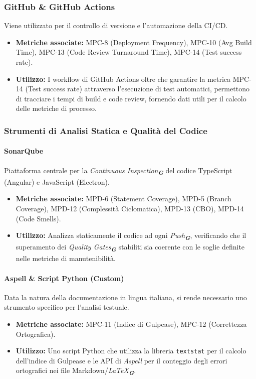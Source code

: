 \documentclass[a4paper,12pt]{article}
\newcommand{\glossario}[1]{\textit{#1}\textsubscript{\textbf{\textit{\textcolor{lightblack}{G}}}}}
\begin{document}
\subsubsection{GitHub \& GitHub Actions}
Viene utilizzato per il controllo di versione e l'automazione della CI/CD.
\begin{itemize}
    \item \textbf{Metriche associate:} MPC-8 (Deployment Frequency), MPC-10 (Avg Build Time), MPC-13 (Code Review Turnaround Time), MPC-14 (Test success rate).
    \item \textbf{Utilizzo:} I workflow di GitHub Actions oltre che garantire la metrica MPC-14 (Test success rate) attraverso l'esecuzione di test automatici, permettono di tracciare i tempi di build e code review, fornendo dati utili per il calcolo delle metriche di processo.
\end{itemize}

\subsubsection{Strumenti di Analisi Statica e Qualità del Codice}

\paragraph{SonarQube}
Piattaforma centrale per la \glossario{Continuous Inspection} del codice
TypeScript (Angular) e JavaScript (Electron).
\begin{itemize}
    \item \textbf{Metriche associate:} MPD-6 (Statement Coverage), MPD-5 (Branch Coverage), MPD-12 (Complessità Ciclomatica), MPD-13 (CBO), MPD-14 (Code Smells).
    \item \textbf{Utilizzo:} Analizza staticamente il codice ad ogni \glossario{Push}, verificando che il superamento dei \glossario{Quality Gates} stabiliti sia coerente con le soglie definite nelle metriche di manutenibilità.
\end{itemize}

\paragraph{Aspell \& Script Python (Custom)}
Data la natura della documentazione in lingua italiana, si rende necessario uno
strumento specifico per l'analisi testuale.
\begin{itemize}
    \item \textbf{Metriche associate:} MPC-11 (Indice di Gulpease), MPC-12 (Correttezza Ortografica).
    \item \textbf{Utilizzo:} Uno script Python che utilizza la libreria \texttt{textstat} per il calcolo dell'indice di Gulpease e le API di \textit{Aspell} per il conteggio degli errori ortografici nei file Markdown/\glossario{LaTeX}.
\end{itemize}
\end{document}
